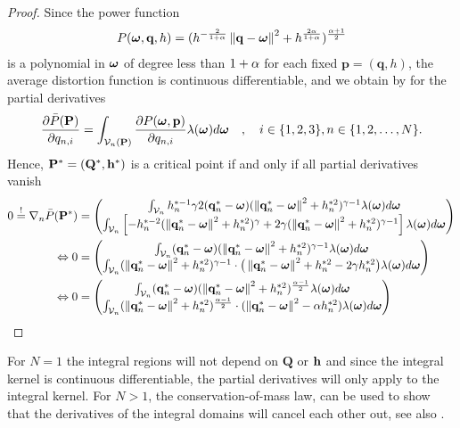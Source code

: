 \documentclass[12pt,onecolumn,final,letterpaper]{IEEEtran}
\newif\ifarxiv\arxivfalse
\newenvironment{remark}{\par\vspace{1.5ex}\noindent{\em Remark\/}.}{\par\vspace{1.5ex}}
\renewcommand{\vq}{\mathbf p}
\renewcommand{\vp}{\mathbf q}
\renewcommand{\vQ}{\mathbf P}
\renewcommand{\vP}{\mathbf Q}
\newcommand{\df}{\ensuremath{\lam}}         %
\newcommand{\Pbar}{\ensuremath{\bar{P}}}         %
\newcommand{\Vor}{\ensuremath{\mathcal{V}}}         %
\begin{document}
\begin{proof}
Since the power function 
%
\begin{align}
  P(\vome,\vp,h)= (h^{-\frac{2}{1+\alp}}\Norm{\vp-\vome}^2 + h^{\frac{2\alp}{1+\alp}})^{\frac{\alp+1}{2}}
\end{align}  
%
is a polynomial in $\boldsymbol{ \omega}$ of degree less than $1+\alpha$ for each fixed $\vq=(\vp,h)$, the average distortion function is continuous
differentiable, and we obtain by \cite[Thm.1]{WJ18} for the partial derivatives 
%
\begin{align}
  \frac{\partial \Pbar(\vQ)}{\partial q_{n,i}} = \int_{\Vor_n(\vQ)} \frac{\partial P(\vome,\vq)}{\partial q_{n,i}}
  \df(\vome)d\vome\quad,\quad i\in\{1,2,3\},n\in\{1,2,\dots,N\}.
\end{align}
%
Hence, $\vQ^*=(\vP^*,\vh^*)$ is a critical point if and only if all partial derivatives vanish 
%
\begin{align}
 0\overset{!}{=} \nabla_n \Pbar(\vQ^*) &= \begin{pmatrix} 
   \int_{\Vor_n} h_n^{*-1} \gam 2 (\vp^*_{n}-\vome)  (\Norm{\vp_n^*-\vome}^2 +h_n^{*2})^{\gam-1}  \df(\vome)d \vome\\
   \int_{\Vor_n} \left[-h_n^{*-2}(\Norm{\vp^*_n-\vome}^2 + h_n^{*2})^{\gam} + 2\gam (\Norm{\vp_n^*-\vome}^2 +h_n^{*2})^{\gam-1}\right]
    \df(\vome)d \vome
  \end{pmatrix} \notag\\
\LRA 0&= \begin{pmatrix}
  \int_{\Vor_n} (\vp^*_{n}-\vome) (\Norm{\vp^*_n-\vome}^2 +h_n^{*2})^{\gam-1} \df(\vome)d \vome\\
  \int_{\Vor_n} (\Norm{\vp^*_n-\vome}^2 +h_n^{*2})^{\gam-1}\cdot \big(\Norm{\vp^*_n-\vome}^2+h_n^{*2} - 2\gam h_n^{*2} \big)
  \df(\vome)d \vome
 \end{pmatrix}\notag\\
 \LRA 0&= \begin{pmatrix}
   \int_{\Vor_n} (\vp_{n}^*-\vome) (\Norm{\vp^*_n-\vome}^2 +h_n^{*2})^{\frac{\alp-1}{2}} \df(\vome)d \vome\\
   \int_{\Vor_n} (\Norm{\vp_n^*-\vome}^2 +h_n^{*2})^{\frac{\alp-1}{2}}\cdot (\Norm{\vp_n^*-\vome}^2 - \alp h_n^{*2} )
   \df(\vome)d \vome
  \end{pmatrix}\label{eq:graddph}
\end{align}
%
\end{proof}
%
\fi
For $N=1$ the integral regions will not depend on $\vP$ or ${\mathbf h}$ and since the integral kernel is continuous differentiable, the
partial derivatives will only apply to the integral kernel. For $N>1$, the conservation-of-mass law, can be used to show
that the derivatives of the integral domains will cancel each other out, see also \cite{CMB05}. 
%
\ifarxiv
\begin{remark}
  The shape of the regions depend on the parameters, which if different for each quantization point (heterogeneous),
  generate spherical and not polyhedral regions. We will show later, that homogeneous parameter selection with polyhedral
  regions will be the optimal regions for $d=1$. 
\end{remark}
\fi
\end{document}
